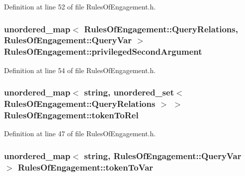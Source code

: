 Definition at line 52 of file Rules\-Of\-Engagement.\-h.

\hypertarget{class_rules_of_engagement_acdc0a8ed701246134911b36aac249c6c}{
\subsubsection[{privileged\-Second\-Argument}]{\setlength{\rightskip}{0pt plus 5cm}unordered\-\_\-map$<$ {\bf Rules\-Of\-Engagement\-::\-Query\-Relations}, {\bf Rules\-Of\-Engagement\-::\-Query\-Var} $>$ Rules\-Of\-Engagement\-::privileged\-Second\-Argument\hspace{0.3cm}{\ttfamily [static]}}}\label{class_rules_of_engagement_acdc0a8ed701246134911b36aac249c6c}


Definition at line 54 of file Rules\-Of\-Engagement.\-h.

\hypertarget{class_rules_of_engagement_ae9b3fd791855b69fdf746d47df2b2bdd}{
\subsubsection[{token\-To\-Rel}]{\setlength{\rightskip}{0pt plus 5cm}unordered\-\_\-map$<$ string, unordered\-\_\-set$<$ {\bf Rules\-Of\-Engagement\-::\-Query\-Relations} $>$ $>$ Rules\-Of\-Engagement\-::token\-To\-Rel\hspace{0.3cm}{\ttfamily [static]}}}\label{class_rules_of_engagement_ae9b3fd791855b69fdf746d47df2b2bdd}


Definition at line 47 of file Rules\-Of\-Engagement.\-h.

\hypertarget{class_rules_of_engagement_ab3e59955494f404502bf165417df74c9}{
\subsubsection[{token\-To\-Var}]{\setlength{\rightskip}{0pt plus 5cm}unordered\-\_\-map$<$ string, {\bf Rules\-Of\-Engagement\-::\-Query\-Var} $>$ Rules\-Of\-Engagement\-::token\-To\-Var\hspace{0.3cm}{\ttfamily [static]}}}\label{class_rules_of_engagement_ab3e59955494f404502bf165417df74c9}


